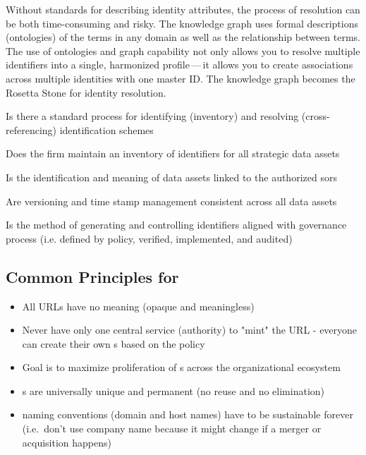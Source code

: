 %
%

\ekgmmContextSection

Without standards for describing identity attributes, the process of resolution can be both time-consuming and risky.
The knowledge graph uses formal descriptions (ontologies) of the terms in any domain as well as the relationship
between terms.
The use of ontologies and graph capability not only allows you to resolve multiple identifiers into a single,
harmonized profile\,---\,it allows you to create associations across multiple identities with one master ID.
The knowledge graph becomes the Rosetta Stone for identity resolution.

\ekgmmcorequestionssection

\begin{core-questions}

  \item [\thesection.1] Is there a standard process for identifying (inventory) and resolving (cross-referencing)
                        identification schemes
  \item [\thesection.2] Does the firm maintain an inventory of identifiers for all strategic data assets
  \item [\thesection.3] Is the identification and meaning of data assets linked to the authorized \glspl{sor}
  \item [\thesection.4] Are versioning and time stamp management consistent across all data assets
  \item [\thesection.5] Is the method of generating and controlling identifiers aligned with governance process
                        (i.e. defined by policy, verified, implemented, and audited)

\end{core-questions}

\subsection*{Common Principles for }

\begin{itemize}
  \item All URLs have no meaning (opaque and meaningless)
  \item Never have only one central service (authority) to "mint" the URL - everyone can create their own
        s based on the policy
  \item Goal is to maximize proliferation of s across the organizational ecosystem
  \item {}s are universally unique and permanent (no reuse and no elimination)
  \item {} naming conventions (domain and host names) have to be sustainable forever
        (i.e.\ don't use company name because it might change if a merger or acquisition happens)
\end{itemize}

